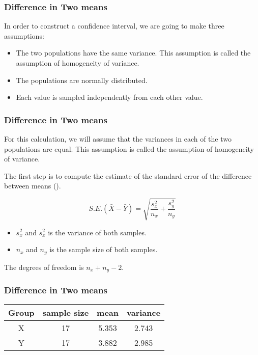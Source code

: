 \documentclass[a4]{beamer}
\begin{document}
\begin{frame}
\frametitle{Difference in Two means}
In order to construct a confidence interval, we are going to make three assumptions:

\begin{itemize}
\item The two populations have the same variance. This assumption is called the assumption of homogeneity of variance. 
\item The populations are normally distributed. 
\item Each value is sampled independently from each other value. 
\end{itemize}
\end{frame}
\begin{frame}
\frametitle{Difference in Two means}
For this calculation, we will assume that the variances in each of the two populations are equal. This assumption is called the assumption of homogeneity of variance. 

The first step is to compute the estimate of the standard error of the difference between means (). 

\[ S.E.(\bar{X}-\bar{Y}) = \sqrt{\frac{s^2_x}{n_x} + \frac{s^2_y}{n_y}} \]

\begin{itemize}
\item $s^2_x$ and $s^2_x$ is the variance of both samples.
\item $n_x$ and $n_y$ is the sample size of both samples.
\end{itemize}
The degrees of freedom is $n_x + n_y -2$.
\end{frame}
\begin{frame}
\frametitle{Difference in Two means}
\begin{center}
\begin{tabular}{|c|c|c|c|}
\hline
Group & sample size & mean & variance \\ \hline
X & 17 & 5.353 & 2.743 \\ \hline
Y & 17 & 3.882 & 2.985 \\ \hline
\end{tabular}
\end{center}
\end{frame}
\end{document}
